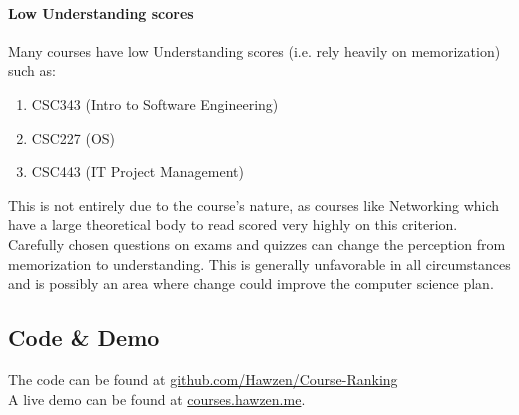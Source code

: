 \documentclass[12pt,a4paper]{article}
\begin{document}
\paragraph{Low Understanding scores}
Many courses have low Understanding scores (i.e. rely heavily on memorization) such as:
\begin{enumerate}
    \item CSC343 (Intro to Software Engineering)
    \item CSC227 (OS)
    \item CSC443 (IT Project Management)
\end{enumerate}
This is not entirely due to the course's nature, as courses like Networking which have a large theoretical body to read scored very highly on this criterion. Carefully chosen questions on exams and quizzes can change the perception from memorization to understanding. This is generally unfavorable in all circumstances and is possibly an area where change could improve the computer science plan.



\subsection{Code \& Demo}
The code can be found at \href{https://github.com/Hawzen/Course-Ranking}{github.com/Hawzen/Course-Ranking} \\
A live demo can be found at \href{http://courses.hawzen.me}{courses.hawzen.me}.
\end{document}
